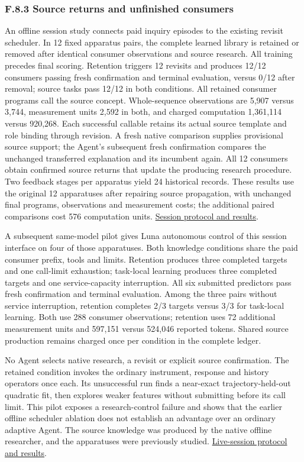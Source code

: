\documentclass[11pt,a4paper]{article}
\begin{document}
\subsubsection*{F.8.3 Source returns and unfinished consumers}

An offline session study connects paid inquiry episodes to the existing revisit
scheduler. In 12 fixed apparatus pairs, the complete learned library is retained
or removed after identical consumer observations and source research. All training
precedes final scoring. Retention triggers 12 revisits and produces 12/12 consumers
passing fresh confirmation and terminal evaluation, versus 0/12 after removal;
source tasks pass 12/12 in both conditions. All retained consumer programs call
the source concept. Whole-sequence observations are 5,907 versus 3,744,
measurement units 2,592 in both, and charged computation 1,361,114 versus 920,268.
Each successful callable retains its actual source template and role binding
through revision. A fresh native comparison supplies provisional source support;
the Agent's subsequent fresh confirmation compares the unchanged transferred
explanation and its incumbent again. All 12 consumers obtain confirmed source
returns that update the producing research procedure. Two feedback stages per
apparatus yield 24 historical records. These results use the original 12
apparatuses after repairing source propagation, with unchanged final programs,
observations and measurement costs; the additional paired comparisons cost 576
computation units. \hyperlink{artifact-77}{Session protocol and results}.


A subsequent same-model pilot gives Luna autonomous control of this session
interface on four of those apparatuses. Both knowledge conditions share the
paid consumer prefix, tools and limits. Retention produces three completed targets
and one call-limit exhaustion; task-local learning produces three completed targets
and one service-capacity interruption. All six submitted predictors pass fresh
confirmation and terminal evaluation. Among the three pairs without service
interruption, retention completes 2/3 targets versus 3/3 for task-local learning.
Both use 288 consumer observations; retention uses 72 additional measurement
units and 597,151 versus 524,046 reported tokens. Shared source production remains
charged once per condition in the complete ledger.


No Agent selects native research, a revisit or explicit source confirmation.
The retained condition invokes the ordinary instrument, response and history
operators once each. Its unsuccessful run finds a near-exact trajectory-held-out
quadratic fit, then explores weaker features without submitting before its call
limit. This pilot exposes a research-control failure and shows that the earlier
offline scheduler ablation does not establish an advantage over an ordinary
adaptive Agent. The source knowledge was produced by the native offline researcher,
and the apparatuses were previously studied. \hyperlink{artifact-78}{Live-session protocol and results}.
\end{document}
